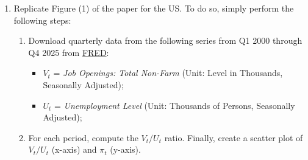 \documentclass[dvipsnames,11pt]{article}
\begin{document}
\begin{enumerate}[resume]
\begin{solution}
                    The key theoretical mechanism is a \emph{capacity constraint on production}: firms can substitute between vacancies and labour to adjust output, but as the labour market approaches full utilisation the marginal cost curve becomes very steep---effectively kinking---because additional output requires either bidding scarce workers away from other firms or accepting longer vacancy durations. Once this constraint binds, small increases in tightness map into large increases in marginal cost and hence in price-setting markups, generating the near-vertical arm of the slanted-L. Below the kink, marginal cost is roughly flat in tightness, so additional slack has little disinflationary bite. Search-and-matching frictions are a complementary force: when $V/U$ is high, hiring takes longer and wage offers must rise to attract workers, reinforcing the cost-side amplification. Crucially, Benigno \& Eggertsson argue that \emph{no structural break or shift in the Phillips curve is needed} to explain both the ``missing disinflation'' and the ``inflation surge''---both phenomena arise naturally from the non-linear shape of a \emph{stable} underlying relationship.
                    
                \end{solution}
        
            \item Replicate Figure (1) of the paper for the US. To do so, simply perform the following steps: 
    
                \begin{enumerate}
                    \item Download quarterly data from the following series from Q1 2000 through Q4 2025 from \href{https://fred.stlouisfed.org}{FRED}:
                    \begin{itemize}
                        \item $V_t$ = \textit{Job Openings: Total Non-Farm} (Unit: Level in Thousands, Seasonally Adjusted);
                        \item $U_t$ = \textit{Unemployment Level} (Unit: Thousands of Persons, Seasonally Adjusted);
                    \end{itemize}
                    
                    \item For each period, compute the $V_t/U_t$ ratio. Finally, create a scatter plot of \(V_t/U_t\) (x-axis) and \(\pi_{t}\) (y-axis). 
            

\end{enumerate}
\end{enumerate}
\end{document}
